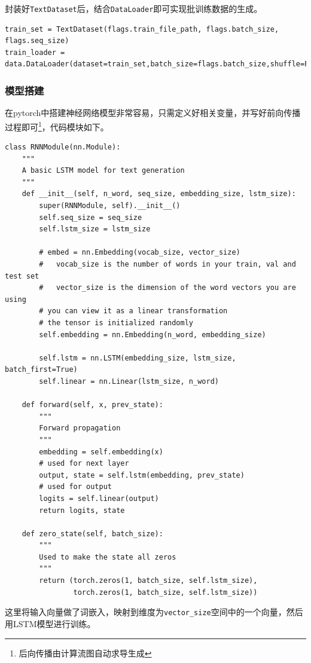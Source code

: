 \documentclass[logo,reportComp]{thesis}
\begin{document}
封装好\verb'TextDataset'后，结合\verb'DataLoader'即可实现批训练数据的生成。
\begin{lstlisting}
train_set = TextDataset(flags.train_file_path, flags.batch_size, flags.seq_size)
train_loader = data.DataLoader(dataset=train_set,batch_size=flags.batch_size,shuffle=False)
\end{lstlisting}

\subsubsection{模型搭建}
在pytorch中搭建神经网络模型非常容易，只需定义好相关变量，并写好前向传播过程即可\footnote{后向传播由计算流图自动求导生成}，代码模块如下。
\begin{lstlisting}
class RNNModule(nn.Module):
    """
    A basic LSTM model for text generation
    """
    def __init__(self, n_word, seq_size, embedding_size, lstm_size):
        super(RNNModule, self).__init__()
        self.seq_size = seq_size
        self.lstm_size = lstm_size

        # embed = nn.Embedding(vocab_size, vector_size)
        #   vocab_size is the number of words in your train, val and test set
        #   vector_size is the dimension of the word vectors you are using
        # you can view it as a linear transformation
        # the tensor is initialized randomly
        self.embedding = nn.Embedding(n_word, embedding_size)

        self.lstm = nn.LSTM(embedding_size, lstm_size, batch_first=True)
        self.linear = nn.Linear(lstm_size, n_word)

    def forward(self, x, prev_state):
        """
        Forward propagation
        """
        embedding = self.embedding(x)
        # used for next layer
        output, state = self.lstm(embedding, prev_state)
        # used for output
        logits = self.linear(output)
        return logits, state

    def zero_state(self, batch_size):
        """
        Used to make the state all zeros
        """
        return (torch.zeros(1, batch_size, self.lstm_size),
                torch.zeros(1, batch_size, self.lstm_size))
\end{lstlisting}

这里将输入向量做了词嵌入，映射到维度为\verb'vector_size'空间中的一个向量，然后用LSTM模型进行训练。
\end{document}
